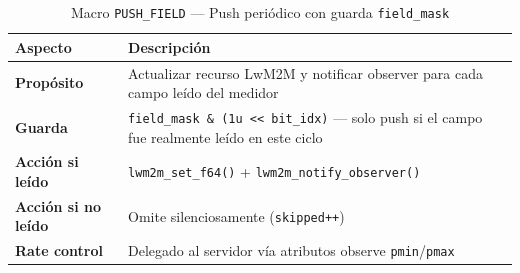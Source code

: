 \begin{table}[htbp]
\centering
\caption{Macro \texttt{PUSH\_FIELD} --- Push periódico con guarda \texttt{field\_mask}}
\label{tab:push-field}
\begin{tabular}{@{}p{3.5cm}p{10cm}@{}}
\toprule
\textbf{Aspecto} & \textbf{Descripción} \\
\midrule
\textbf{Propósito} & Actualizar recurso LwM2M y notificar observer para cada campo leído del medidor \\
\textbf{Guarda} & \texttt{field\_mask \& (1u << bit\_idx)} --- solo push si el campo fue realmente leído en este ciclo \\
\textbf{Acción si leído} & \texttt{lwm2m\_set\_f64()} + \texttt{lwm2m\_notify\_observer()} \\
\textbf{Acción si no leído} & Omite silenciosamente (\texttt{skipped++}) \\
\textbf{Rate control} & Delegado al servidor vía atributos observe \texttt{pmin}/\texttt{pmax} \\
\bottomrule
\end{tabular}
\end{table}

